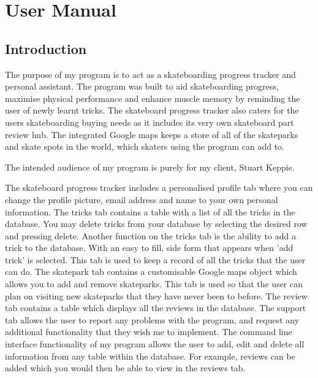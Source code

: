 \chapter{User Manual}


\startcontents[chapters]


\section{Introduction}

The purpose of my program is to act as a skateboarding progress tracker and personal assistant. The program was built to aid skateboarding progress, maximise physical performance and enhance muscle memory by reminding the user of newly learnt tricks. The skateboard progress tracker also caters for the users skateboarding buying needs as it includes its very own skateboard part review hub. The integrated Google maps keeps a store of all of the skateparks and skate spots in the world, which skaters using the program can add to.

The intended audience of my program is purely for my client, Stuart Keppie.

The skateboard progress tracker includes a personalised profile tab where you can change the profile picture, email address and name to your own personal information. The tricks tab contains a table with a list of all the tricks in the database. You may delete tricks from your database by selecting the desired row and pressing delete. Another function on the tricks tab is the ability to add a trick to the database. With an easy to fill, side form that appears when 'add trick' is selected. This tab is used to keep a record of all the tricks that the user can do. The skatepark tab contains a customisable Google maps object which allows you to add and remove skateparks. This tab is used so that the user can plan on visiting new skateparks that they have never been to before. The review tab contains a table which displays all the reviews in the database. The support tab allows the user to report any problems with the program, and request any additional functionality that they wish me to implement. The command line interface functionality of my program allows the user to add, edit and delete all information from any table within the database. For example, reviews can be added which you would then be able to view in the reviews tab.





